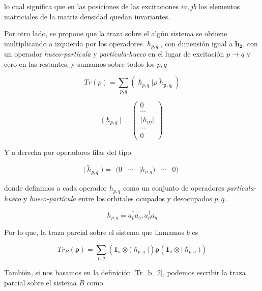 \documentclass[
	12pt, %
]{fphw}
\begin{document}
lo cual significa que en las posiciones de las excitaciones $ia,jb$ los elementos matriciales de la matriz densidad
quedan invariantes.


Por otro lado, se propone que la traza sobre el algún sistema se obtiene multiplicando a izquierda por 
los operadores $\bm{\hslash}_{p,q}$, con dimensión igual a $\bm{h_2}$, con un operador \textit{hueco-partícula} y 
\textit{partícula-hueco} en el lugar de excitación $p\rightarrow q$ y cero en las restantes, y 
sumamos sobre todos los $p,q$

\begin{equation}\label{Tr_rho_total}
	Tr(\rho) =  \sum_{p,q} ( \bm{\hslash}_{p,q} | \rho  \bm{\widetilde{\hslash}_{p,q}} )   
\end{equation}

\begin{equation}
	( \bm{\hslash}_{p,q} | = \left(\begin{matrix}
		0 \\
		\cdots \\
		(h_{pq}| \\
		\cdots \\
		0
	\end{matrix} \right)
\end{equation}

Y a derecha por operadores filas del tipo

\begin{equation}
	| \widetilde{\bm{\hslash}}_{p,q} ) = \begin{matrix}
		( 0 &\cdots& |h_{p,q})& \cdots& 0)
	\end{matrix}
\end{equation}

donde definimos a cada operador $h_{p,q}$ como un conjunto de operadores 
\textit{partícula-hueco} y \textit{hueco-partícula} entre los orbitales ocupados y desocupados $p,q$.

\begin{equation}
	h_{p,q} = {a^\dagger_p a_q, a^\dagger_p a_q}
\end{equation}

Por lo que, la traza parcial sobre el sistema que llamamos $b$ es 

\begin{equation}
	Tr_B(\bm{\rho}) = \sum_{p,q}  \left(\bm{1}_a \otimes ( \bm{\hslash}_{p,q} | \right) \bm{\rho}  \left( \bm{1}_a \otimes |\bm{\hslash}_{p,q}) \right)
\end{equation}

También, si nos basamos en la definición \ref{Tr_b_2}, podemos escribir la traza parcial sobre el sistema $B$ como 
\end{document}
